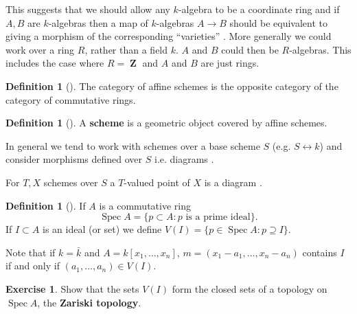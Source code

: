 \documentclass[10pt,]{book}
\newcommand{\terminology}[1]{\textbf{#1}}
\theoremstyle{plain}
\theoremstyle{definition}
\newtheorem{definition}[theorem]{Definition}
\newtheorem{exercise}[theorem]{Exercise}
\numberwithin{equation}{section}
\DeclareMathOperator{\ZZ}{\mathbf{Z}}
\DeclareMathOperator{\Spec}{Spec}
\begin{document}
          This suggests that we should allow any \(k\)-algebra to be a coordinate ring and if \(A,B\) are \(k\)-algebras then a map of \(k\)-algebras \(A\to B\) should be equivalent to giving a morphism of the corresponding ``varieties'' .
          More generally we could work over a ring \(R\), rather than a field \(k\).
          \(A\) and \(B\) could then be \(R\)-algebras.
          This includes the case where \(R= \ZZ\) and \(A\) and \(B\) are just rings.
\begin{definition}[]\label{definition-1}
The category of affine schemes is the opposite category of the category of commutative rings.\end{definition}
\begin{definition}[]\label{definition-2}
A \terminology{scheme} is a geometric object covered by affine schemes.\end{definition}
\par
In general we tend to work with schemes over a base scheme \(S\) (e.g. \(S\leftrightarrow k\)) and consider morphisms defined over \(S\) i.e. diagrams .
        
        For \(T,X\) schemes over \(S\) a \(T\)-valued point of \(X\) is a diagram .%
\begin{definition}[]\label{definition-3}
If \(A\) is a commutative ring \[\Spec A = \{p\subset A : p \text{ is a prime ideal}\}.\]
            If \(I\subset A\) is an ideal (or set) we define \(V(I) = \{p\in \Spec A : p\supseteq I\}\).
          \end{definition}
\par
Note that if \(k = \bar{k}\) and \(A = k[x_1,\ldots,x_n]\), \(m = (x_1 - a_1,\ldots,x_n - a_n)\) contains \(I\) if and only if \((a_1,\ldots,a_n) \in V(I)\).%
\begin{exercise}\label{exercise-2}
Show that the sets \(V(I)\) form the closed sets of a topology on \(\Spec A\), the \terminology{Zariski topology}.\end{exercise}
\par
\end{document}
